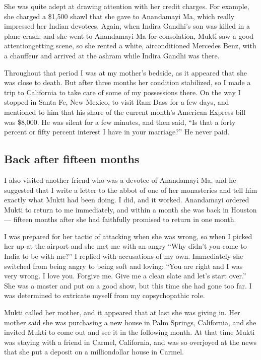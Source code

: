 \documentclass[a5paper,10pt,english]{book}
\begin{document}
\sphinxAtStartPar
She was quite adept at drawing attention with her credit charges. For
example, she charged a \$1,500 shawl that she gave to Anandamayi Ma,
which really impressed her Indian devotees. Again, when Indira Gandhi’s
son was killed in a plane crash, and she went to Anandamayi Ma for
consolation, Mukti saw a good attention\sphinxhyphen{}getting scene, so she rented a
white, air\sphinxhyphen{}conditioned Mercedes Benz, with a chauffeur and arrived at
the ashram while Indira Gandhi was there.

\sphinxAtStartPar
Throughout that period I was at my mother’s bedside, as it appeared that
she was close to death. But after three months her condition stabilized,
so I made a trip to California to take care of some of my possessions
there. On the way I stopped in Santa Fe, New Mexico, to visit Ram Dass
for a few days, and mentioned to him that his share of the current
month’s American Express bill was \$8,000. He was silent for a few
minutes, and then said, “Is that a forty percent or fifty percent
interest I have in your marriage?” He never paid.


\subsection{Back after fifteen months}
\label{\detokenize{psychopaths:back-after-fifteen-months}}
\sphinxAtStartPar
I also visited another friend who was a devotee of Anandamayi Ma, and he
suggested that I write a letter to the abbot of one of her monasteries
and tell him exactly what Mukti had been doing. I did, and it worked.
Anandamayi ordered Mukti to return to me immediately, and within a month
she was back in Houston — fifteen months after she had faithfully
promised to return in one month.

\sphinxAtStartPar
I was prepared for her tactic of attacking when she was wrong, so when I
picked her up at the airport and she met me with an angry “Why didn’t
you come to India to be with me?” I replied with accusations of my own.
Immediately she switched from being angry to being soft and loving: “You
are right and I was very wrong. I love you. Forgive me. Give me a clean
slate and let’s start over.” She was a master and put on a good show,
but this time she had gone too far. I was determined to extricate myself
from my co\sphinxhyphen{}psychopathic role.

\sphinxAtStartPar
Mukti called her mother, and it appeared that at last she was giving in.
Her mother said she was purchasing a new house in Palm Springs,
California, and she invited Mukti to come out and see it in the
following month. At that time Mukti was staying with a friend in Carmel,
California, and was so overjoyed at the news that she put a deposit on a
million\sphinxhyphen{}dollar house in Carmel.
\end{document}
